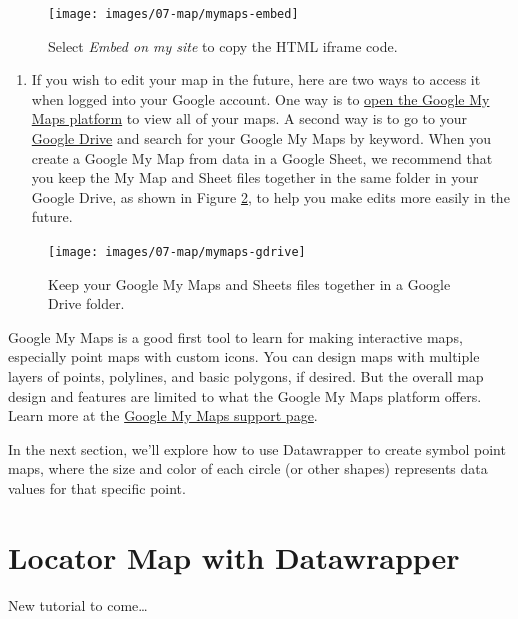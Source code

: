 \documentclass[
  english,
]{book}
\providecommand{\tightlist}{%
  \setlength{\itemsep}{0pt}\setlength{\parskip}{0pt}}
\begin{document}
\begin{figure}
\texttt{[image: images/07-map/mymaps-embed]} \caption{Select \emph{Embed on my site} to copy the HTML iframe code.}\label{fig:mymaps-embed}
\end{figure}

\begin{enumerate}
\def\labelenumi{\arabic{enumi}.}
\setcounter{enumi}{18}
\tightlist
\item
  If you wish to edit your map in the future, here are two ways to access it when logged into your Google account. One way is to \href{https://www.google.com/mymaps/}{open the Google My Maps platform} to view all of your maps. A second way is to go to your \href{https://drive.google.com}{Google Drive} and search for your Google My Maps by keyword. When you create a Google My Map from data in a Google Sheet, we recommend that you keep the My Map and Sheet files together in the same folder in your Google Drive, as shown in Figure \ref{fig:mymaps-gdrive}, to help you make edits more easily in the future.
\end{enumerate}



\begin{figure}
\texttt{[image: images/07-map/mymaps-gdrive]} \caption{Keep your Google My Maps and Sheets files together in a Google Drive folder.}\label{fig:mymaps-gdrive}
\end{figure}

Google My Maps is a good first tool to learn for making interactive maps, especially point maps with custom icons. You can design maps with multiple layers of points, polylines, and basic polygons, if desired. But the overall map design and features are limited to what the Google My Maps platform offers. Learn more at the \href{https://support.google.com/mymaps}{Google My Maps support page}.

In the next section, we'll explore how to use Datawrapper to create symbol point maps, where the size and color of each circle (or other shapes) represents data values for that specific point.

\hypertarget{locatormap-datawrapper}{%
\section*{Locator Map with Datawrapper}\label{locatormap-datawrapper}}

New tutorial to come\ldots{}
\end{document}
